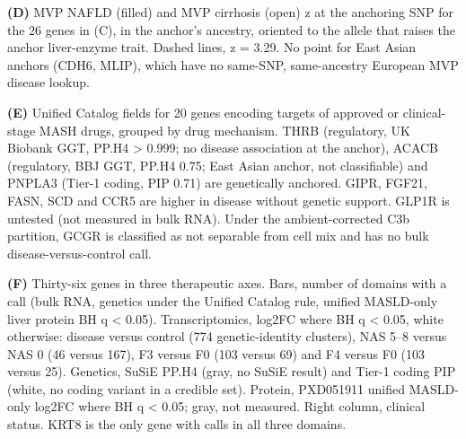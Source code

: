 \textbf{(D)} MVP NAFLD (filled) and MVP cirrhosis (open) z at the anchoring SNP for the 26 genes in (C), in the anchor's ancestry, oriented to the allele that raises the anchor liver-enzyme trait. Dashed lines, \textbar z\textbar{} = 3.29. No point for East Asian anchors (CDH6, MLIP), which have no same-SNP, same-ancestry European MVP disease lookup.

\textbf{(E)} Unified Catalog fields for 20 genes encoding targets of approved or clinical-stage MASH drugs, grouped by drug mechanism. THRB (regulatory, UK Biobank GGT, PP.H4 \textgreater{} 0.999; no disease association at the anchor), ACACB (regulatory, BBJ GGT, PP.H4 0.75; East Asian anchor, not classifiable) and PNPLA3 (Tier-1 coding, PIP 0.71) are genetically anchored. GIPR, FGF21, FASN, SCD and CCR5 are higher in disease without genetic support. GLP1R is untested (not measured in bulk RNA). Under the ambient-corrected C3b partition, GCGR is classified as not separable from cell mix and has no bulk disease-versus-control call.

\textbf{(F)} Thirty-six genes in three therapeutic axes. Bars, number of domains with a call (bulk RNA, genetics under the Unified Catalog rule, unified MASLD-only liver protein BH q \textless{} 0.05). Transcriptomics, log2FC where BH q \textless{} 0.05, white otherwise: disease versus control (774 genetic-identity clusters), NAS 5--8 versus NAS 0 (46 versus 167), F3 versus F0 (103 versus 69) and F4 versus F0 (103 versus 25). Genetics, SuSiE PP.H4 (gray, no SuSiE result) and Tier-1 coding PIP (white, no coding variant in a credible set). Protein, PXD051911 unified MASLD-only log2FC where BH q \textless{} 0.05; gray, not measured. Right column, clinical status. KRT8 is the only gene with calls in all three domains.

